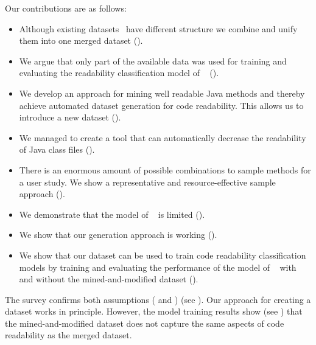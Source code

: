 \documentclass[%
class=scrreprt,
chapterprefix=false,%
open=right,%
twoside=false,%
paper=a4,%
logofile={Logo\_zentral\_farbig\_EN.png},%
thesistype=master,%
UKenglish,%
]{se2thesis}
\theoremstyle{definition}
\newcommand{\citeolddataset}{\cite{buse2009learning, dorn2012general, scalabrino2018comprehensive}\xspace}
\begin{document}
	Our contributions are as follows:
	\begin{itemize}
		\item Although existing datasets~\citeolddataset have different structure we combine and unify them into one merged dataset ().
		\item We argue that only part of the available data was used for training and evaluating the readability classification model of \citeauthor{mi2022towards}~\cite{mi2022towards} ().
		\item We develop an approach for mining well readable Java methods and thereby achieve automated dataset generation for code readability. This allows us to introduce a new dataset ().
		\item We managed to create a tool that can automatically decrease the readability of Java class files ().
		\item There is an enormous amount of possible combinations to sample methods for a user study. We show a representative and resource-effective sample approach ().
		\item We demonstrate that the model of \citeauthor{mi2022towards}~\cite{mi2022towards} is limited ().
		\item We show that our generation approach is working ().
		\item We show that our dataset can be used to train code readability classification models by training and evaluating the performance of the model of \citeauthor{mi2022towards}~\cite{mi2022towards} with and without the mined-and-modified dataset ().
	\end{itemize}
	

	The survey confirms both assumptions ( and ) (see ).
	Our approach for creating a dataset works in principle. However, the model training results show (see ) that the mined-and-modified dataset does not capture the same aspects of code readability as the merged dataset. 
		
\end{document}
